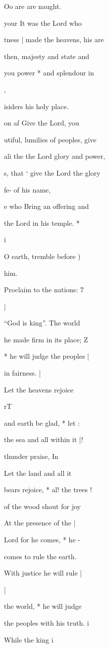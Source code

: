 \documentclass{breviary}
\begin{document}
\begin{brevbody}
Oo are are naught.

your It was the Lord who

tness | made the heavens, his are

then, majesty and state and

you power * and splendour in

,

isiders his holy place.

on af Give the Lord, you

utiful, lumilies of peoples, give

ali the the Lord glory and power,

s, that ‘ give the Lord the glory

\vers{} fe- of his name,

e who Bring an offering and

\blackrule
the Lord in his temple. *

i

O earth, tremble before )

him.

Proclaim to the nations: 7

|

“God is king”. The world

he made firm in its place; Z

* he will judge the peoples |

in fairness. |

Let the heavens rejoice

\begin{rubricpar}
rT

\end{rubricpar}
and earth be glad, * let :

the sea and all within it |!

thunder praise, In

Let the land and all it

bears rejoice, * al! the trees !

of the wood shout for joy

At the presence of the |

Lord for he comes, * he -

comes to rule the earth.

With justice he will rule |

|

the world, * he will judge

the peoples with his truth. i

While the king i


\end{brevbody}
\end{document}
